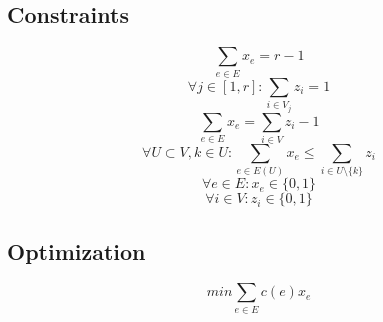 \documentclass{article}
\begin{document}
\subsection{Constraints}
\[ \sum_{e\in E}x_e = r-1 \]
\[ \forall j \in [1,r] : \sum_{i\in V_j}z_i = 1 \]
\[ \sum_{e\in E}x_e = \sum_{i\in V}z_i - 1 \]
\[ \forall U \subset V, k \in U : \sum_{e\in E(U)}x_e \leq \sum_{i\in U \setminus \{k\}}z_i \]
\[ \forall e \in E : x_e \in \{0,1\} \]
\[ \forall i \in V : z_i \in \{0,1\} \]

\subsection{Optimization}
\[ min \sum_{e\in E}c(e)x_e \]

\clearpage

 

\end{document}
